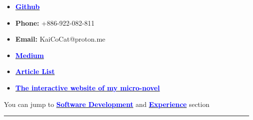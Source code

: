 \documentclass[11pt]{article}
\begin{document}
\begin{multicols*}{2}
    





\begin{definitionbox}
{\footnotesize
\begin{itemize}[noitemsep]
    \item \href{https://github.com/Kuo-TingKai}{\textbf{\textcolor{blue}{Github}}}
    \item \textbf{Phone:} +886-922-082-811
    \item \textbf{Email:} KaiCoCat@proton.me
    \item \href{https://medium.com/@nehsm30126}{\textbf{\textcolor{blue}{Medium}}} 
    \item \href{https://www.overleaf.com/read/xzdtxtgxtnby#49163b}{\textbf{\textcolor{blue}{Article List}}}
    \item \href{https://github.com/Kuo-TingKai/theorem-dream}{\textbf{\textcolor{blue}{The interactive website of my micro-novel}}}
\end{itemize}
}
\end{definitionbox}

\begin{examplebox}
You can jump to \href{#software-dev}{\textbf{\textcolor{blue}{Software Development}}} and \href{#experience}{\textbf{\textcolor{blue}{Experience}}} section\\
\end{examplebox}

\hrule


\end{multicols*}
\end{document}
